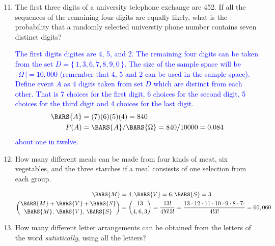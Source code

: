 \documentclass[10pt,a4paper]{report}
\newcommand{\BLUE}[1]{\textcolor{blue}{#1}}
\begin{document}
\begin{enumerate}
	\setcounter{enumi}{10}
	\item The first three digits of a university telephone exchange are 452.  If all the sequences of the remaining four digits are equally likely, what is the probability that a randomly selected universtiy phone number contains seven distinct digits?
	
\BLUE{The first digits digites are 4, 5, and 2.  The remaining four digits can be taken from the set $D=\{\, 1,3,6,7,8,9,0\,\}$.  The size of the sample space will be $|\,\Omega\,| = 10,000$ (remember that 4, 5 and 2 can be used in the sample space). Define event $A$ as 4 digits taken from set $D$ which are distinct from each other.  That is 7 choices for the first digit, 6 choices for the second digit, 5 choices for the third digit and 4 choices for the last digit.
\begin{align*}
	\BARS{A} &= (7)(6)(5)(4) = 840 \\
	P(A) &= \BARS{A}/\BARS{\Omega} = 840/10000 = 0.084
\end{align*}about one in twelve.
}
	\setcounter{enumi}{14}
	\item How many different meals can be made from four kinds of meat, six vegetables, and the three starches if a meal consissts of one selection from each group.
	
\BLUE{\begin{align*}
	\BARS{M} &= 4, \BARS{V} = 6, \BARS{S} = 3\\
	\binom{ \BARS{M}+ \BARS{V} +\BARS{S}}{\BARS{M},\,\BARS{V},\, \BARS{S}} &= \binom{13}{4,6,3} = \frac{13!}{4!6!3!} = \frac{13\cdot 12\cdot 11\cdot 10\cdot 9\cdot 8\cdot 7\cdot }{4!3!} = 60,060
\end{align*}
}
	\item How many different letter arrangements can be obtained from the letters of the word \textit{satistically}, using all the letters?

\end{enumerate}
\end{document}
